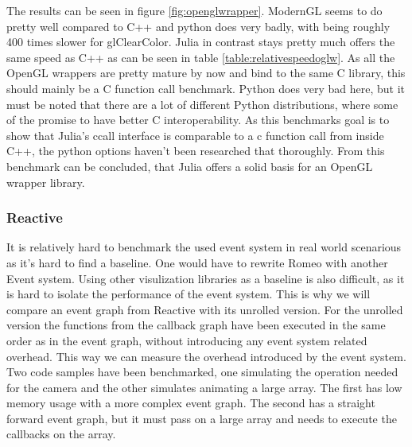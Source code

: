 The results can be seen in figure \ref{fig:openglwrapper}.
ModernGL seems to do pretty well compared to C++ and python does very badly, with being roughly 400 times slower for glClearColor.
Julia in contrast stays pretty much offers the same speed as C++ as can be seen in table \ref{table:relativespeedoglw}.
As all the OpenGL wrappers are pretty mature by now and bind to the same C library, this should mainly be a C function call benchmark.
Python does very bad here, but it must be noted that there are a lot of different Python distributions, where some of the promise to have better C interoperability. As this benchmarks goal is to show that Julia's ccall interface is comparable to a c function call from inside C++, the python options haven't been researched that thoroughly.
From this benchmark can be concluded, that Julia offers a solid basis for an \ac{OpenGL} wrapper library.

\subsubsection{Reactive}

It is relatively hard to benchmark the used event system in real world scenarious as it's hard to find a baseline.
One would have to rewrite Romeo with another Event system. Using other visulization libraries as a baseline is also difficult, as it is hard to isolate the performance of the event system.
This is why we will compare an event graph from Reactive with its unrolled version.
For the unrolled version the functions from the callback graph have been executed in the same order as in the event graph, without introducing any event system related overhead.
This way we can measure the overhead introduced by the event system.
Two code samples have been benchmarked, one simulating the operation needed for the camera and the other simulates animating a large array.
The first has low memory usage with a more complex event graph. The second has a straight forward event graph, but it must pass on a large array and needs to execute the callbacks on the array.

